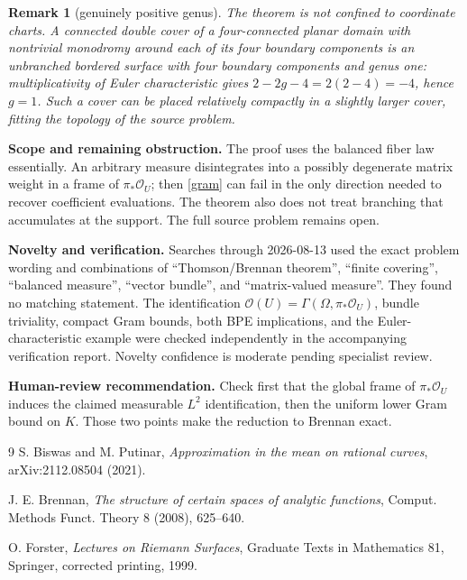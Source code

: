 \documentclass[11pt]{article}
\newtheorem{remark}{Remark}
\newcommand{\OO}{\mathcal O}
\begin{document}
\begin{remark}[genuinely positive genus]
The theorem is not confined to coordinate charts. A connected double cover
of a four-connected planar domain with nontrivial monodromy around each of
its four boundary components is an unbranched bordered surface with four
boundary components and genus one: multiplicativity of Euler characteristic
gives $2-2g-4=2(2-4)=-4$, hence $g=1$. Such a cover can be placed relatively
compactly in a slightly larger cover, fitting the topology of the source
problem.
\end{remark}

\textbf{Scope and remaining obstruction.} The proof uses the balanced fiber
law essentially. An arbitrary measure disintegrates into a possibly
degenerate matrix weight in a frame of $\pi_*\OO_U$; then \eqref{gram} can
fail in the only direction needed to recover coefficient evaluations. The
theorem also does not treat branching that accumulates at the support. The
full source problem remains open.

\textbf{Novelty and verification.} Searches through 2026-08-13 used the exact
problem wording and combinations of ``Thomson/Brennan theorem'', ``finite
covering'', ``balanced measure'', ``vector bundle'', and ``matrix-valued
measure''. They found no matching statement. The identification
$\OO(U)=\Gamma(\Omega,\pi_*\OO_U)$, bundle triviality, compact Gram bounds,
both BPE implications, and the Euler-characteristic example were checked
independently in the accompanying verification report. Novelty confidence is
moderate pending specialist review.

\textbf{Human-review recommendation.} Check first that the global frame of
$\pi_*\OO_U$ induces the claimed measurable $L^2$ identification, then the
uniform lower Gram bound on $K$. Those two points make the reduction to
Brennan exact.

\begin{thebibliography}{9}
S. Biswas and M. Putinar,
\emph{Approximation in the mean on rational curves},
arXiv:2112.08504 (2021).

J. E. Brennan,
\emph{The structure of certain spaces of analytic functions},
Comput. Methods Funct. Theory 8 (2008), 625--640.

O. Forster,
\emph{Lectures on Riemann Surfaces}, Graduate Texts in Mathematics 81,
Springer, corrected printing, 1999.
\end{thebibliography}
\end{document}

